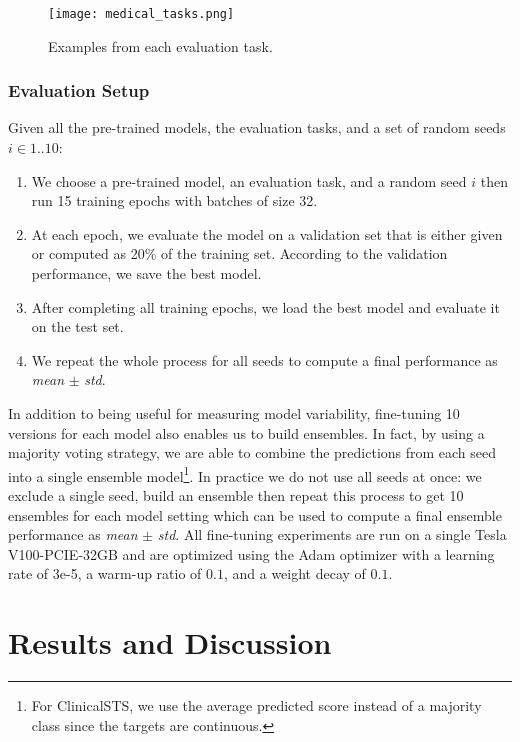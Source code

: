 \documentclass[11pt]{article}
\begin{document}
\begin{figure}[htbp]
\begin{center} 
\texttt{[image: medical\_tasks.png]}
\end{center} 
\caption{Examples from each evaluation task.} \label{medical_tasks}
\end{figure}

\subsubsection{Evaluation Setup}

Given all the pre-trained models, the evaluation tasks, and a set of random seeds $i \in {1..10}$:
\begin{enumerate}
    \item We choose a pre-trained model, an evaluation task, and a random seed $i$ then run 15 training epochs with batches of size 32. \item At each epoch, we evaluate the model on a validation set that is either given or computed as 20\% of the training set. According to the validation performance, we save the best model. \item After completing all training epochs, we load the best model and evaluate it on the test set. \item We repeat the whole process for all seeds to compute a final performance as \textit{mean} $\pm$ \textit{std}.
\end{enumerate}

In addition to being useful for measuring model variability, fine-tuning 10 versions for each model also enables us to build ensembles. In fact, by using a majority voting strategy, we are able to combine the predictions from each seed into a single ensemble model\footnote{For ClinicalSTS, we use the average predicted score instead of a majority class since the targets are continuous.}. In practice we do not use all seeds at once: we exclude a single seed, build an ensemble then repeat this process to get 10 ensembles for each model setting which can be used to compute a final ensemble performance as \textit{mean} $\pm$ \textit{std}. All fine-tuning experiments are run on a single Tesla\,V100-PCIE-32GB and are optimized using the Adam optimizer \cite{kingma2014adam} with a learning rate of 3e-5, a warm-up ratio of $0.1$, and a weight decay of $0.1$.

\section{Results and Discussion}
\end{document}
